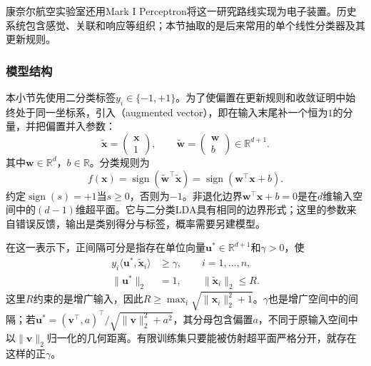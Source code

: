 康奈尔航空实验室还用Mark I Perceptron将这一研究路线实现为电子装置。历史系统包含感觉、关联和响应等组织；本节抽取的是后来常用的单个线性分类器及其更新规则。

\subsubsection{模型结构}
\label{sec:classification-perceptron-model}

本小节先使用二分类标签$y_i\in\{-1,+1\}$。为了使偏置在更新规则和收敛证明中始终处于同一坐标系，引入（augmented vector），即在输入末尾补一个恒为$1$的分量，并把偏置并入参数：
\begin{equation}
  \label{eq:classification-perceptron-augmented}
  \tilde{\bm{x}}=
    \begin{pmatrix}\bm{x}\\1\end{pmatrix},\qquad
  \tilde{\bm{w}}=
    \begin{pmatrix}\bm{w}\\b\end{pmatrix}
    \in\mathbb{R}^{d+1}.
\end{equation}
其中$\bm{w}\in\mathbb{R}^{d}$，$b\in\mathbb{R}$。分类规则为
\begin{equation}
  \label{eq:classification-perceptron-prediction}
  f(\bm{x})=\operatorname{sign}
    (\tilde{\bm{w}}^{\top}\tilde{\bm{x}})
    =\operatorname{sign}(\bm{w}^{\top}\bm{x}+b).
\end{equation}
约定$\operatorname{sign}(s)=+1$当$s\geq0$，否则为$-1$。非退化边界$\bm{w}^{\top}\bm{x}+b=0$是在$d$维输入空间中的$(d-1)$维超平面。它与二分类LDA具有相同的边界形式；这里的参数来自错误反馈，输出是类别得分与标签，概率需要另建模型。

在这一表示下，正间隔可分是指存在单位向量$\bm{u}^\ast\in\mathbb{R}^{d+1}$和$\gamma>0$，使
\begin{equation}
  \label{eq:classification-perceptron-margin}
  \begin{aligned}
    y_i\langle\bm{u}^\ast,\tilde{\bm{x}}_i\rangle
      &\geq\gamma,\qquad i=1,\ldots,n,\\
    \|\bm{u}^\ast\|_2&=1,\qquad
    \|\tilde{\bm{x}}_i\|_2\leq R .
  \end{aligned}
\end{equation}
这里$R$约束的是增广输入，因此$R\geq\max_i\sqrt{\|\bm{x}_i\|_2^2+1}$。$\gamma$也是增广空间中的间隔；若$\bm{u}^\ast=(\bm{v}^{\top},a)^{\top}/\sqrt{\|\bm{v}\|_2^2+a^2}$，其分母包含偏置$a$，不同于原输入空间中以$\|\bm{v}\|_2$归一化的几何距离。有限训练集只要能被仿射超平面严格分开，就存在这样的正$\gamma$。


